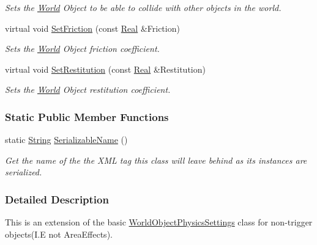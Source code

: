 \begin{DoxyCompactItemize}
\begin{DoxyCompactList}\small\item\em Sets the \hyperlink{classMezzanine_1_1World}{World} Object to be able to collide with other objects in the world. \item\end{DoxyCompactList}\item 
virtual void \hyperlink{classMezzanine_1_1NonTriggerPhysicsSettings_a75f0c352df35028b7b51c8c14bcba8ce}{SetFriction} (const \hyperlink{namespaceMezzanine_a726731b1a7df72bf3583e4a97282c6f6}{Real} \&Friction)
\begin{DoxyCompactList}\small\item\em Sets the \hyperlink{classMezzanine_1_1World}{World} Object friction coefficient. \item\end{DoxyCompactList}\item 
virtual void \hyperlink{classMezzanine_1_1NonTriggerPhysicsSettings_aafac25739c10d408c38a3fdd107897be}{SetRestitution} (const \hyperlink{namespaceMezzanine_a726731b1a7df72bf3583e4a97282c6f6}{Real} \&Restitution)
\begin{DoxyCompactList}\small\item\em Sets the \hyperlink{classMezzanine_1_1World}{World} Object restitution coefficient. \item\end{DoxyCompactList}\end{DoxyCompactItemize}
\subsubsection*{Static Public Member Functions}
\begin{DoxyCompactItemize}
\item 
static \hyperlink{namespaceMezzanine_acf9fcc130e6ebf08e3d8491aebcf1c86}{String} \hyperlink{classMezzanine_1_1NonTriggerPhysicsSettings_aaa6448dd1e05f3ca9ac673e924ef26af}{SerializableName} ()
\begin{DoxyCompactList}\small\item\em Get the name of the the XML tag this class will leave behind as its instances are serialized. \item\end{DoxyCompactList}\end{DoxyCompactItemize}


\subsubsection{Detailed Description}
This is an extension of the basic \hyperlink{classMezzanine_1_1WorldObjectPhysicsSettings}{WorldObjectPhysicsSettings} class for non-\/trigger objects(I.E not AreaEffects). 

